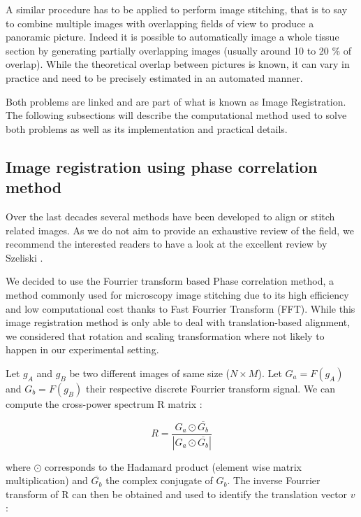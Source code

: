 \documentclass[12pt]{article}
\begin{document}
A similar procedure has to be applied to perform image stitching, that is to say to combine multiple images with overlapping fields of view to produce a panoramic picture. Indeed it is possible to automatically image a whole tissue section by generating partially overlapping images (usually around 10 to 20 \% of overlap). While the theoretical overlap between pictures is known, it can vary in practice and need to be precisely estimated in an automated manner.

Both problems are linked and are part of what is known as Image Registration. The following subsections will describe the computational method used to solve both problems as well as its implementation and practical details.


\subsection{Image registration using phase correlation method}

Over the last decades several methods have been developed to align or stitch related images. As we do not aim to provide an exhaustive review of the field, we recommend the interested readers to have a look at the excellent review by Szeliski \citep{szeliski_image_2006}. 

We decided to use the Fourrier transform based Phase correlation method, a method commonly used for microscopy image stitching \citep{szeliski_image_2006,preibisch_globally_2009} due to its high efficiency and low computational cost thanks to Fast Fourrier Transform (FFT). While this image registration method is only able to deal with translation-based alignment, we considered that rotation and scaling transformation where not likely to happen in our experimental setting. 

Let $g_{A}$ and $g_{B}$ be two different images of same size ($N \times M$). Let $G_{a} = F(g_{A})$ and $G_{b} = F(g_{B})$ their respective discrete Fourrier transform signal. We can compute the cross-power spectrum  R matrix :

\begin{equation}
R = \frac{G_{a} \odot \overline{G_{b}}}{|G_{a} \odot \overline{G_{b}}|}
\label{eq:Cross_power_spectrum}
\end{equation}

where $\odot$ corresponds to the Hadamard product (element wise matrix multiplication) and  $\overline{G_{b}}$ the complex conjugate of ${G_{b}}$.  The inverse Fourrier transform of R can then be obtained and used to identify the translation vector $v$ :
\end{document}
